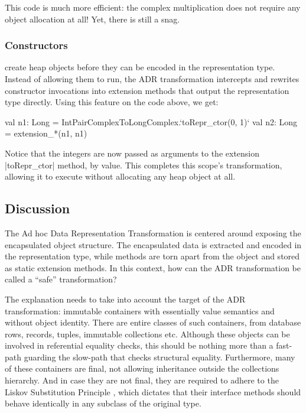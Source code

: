 This code is much more efficient: the complex multiplication does not require any object allocation at all! Yet, there is still a snag.

\subsubsection{Constructors} create heap objects before they can be encoded in the representation type. Instead of allowing them to run, the ADR transformation intercepts and rewrites constructor invocations into extension methods that output the representation type directly. Using this feature on the code above, we get:

\begin{lstlisting-nobreak}
val n1: Long = IntPairComplexToLongComplex.`toRepr_ctor(0, 1)`
val n2: Long = extension_*(n1, n1)
\end{lstlisting-nobreak}

Notice that the integers are now passed as arguments to the extension |toRepr_ctor| method, by value. This completes this scope's transformation, allowing it to execute without allocating any heap object at all.



\subsection{Discussion}
\label{sec:ildl:discussion}
The Ad hoc Data Representation Transformation is centered around exposing the encapsulated object structure. The encapsulated data is extracted and encoded in the representation type, while methods are torn apart from the object and stored as static extension methods. In this context, how can the ADR transformation be called a ``safe'' transformation?

The explanation needs to take into account the target of the ADR transformation: immutable containers with essentially value semantics and without object identity. There are entire classes of such containers, from database rows, records, tuples, immutable collections etc. Although these objects can be involved in referential equality checks, this should be nothing more than a fast-path guarding the slow-path that checks structural equality. Furthermore, many of these containers are final, not allowing inheritance outside the collections hierarchy. And in case they are not final, they are required to adhere to the Liskov Substitution Principle \cite{liskov-substitution-principle}, which dictates that their interface methods should behave identically in any subclass of the original type.

